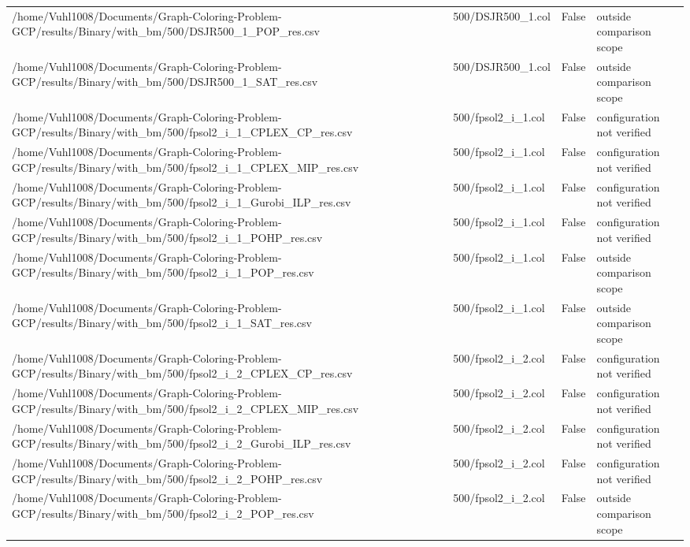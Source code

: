 \begin{table}[htbp]
\begin{tabular}{llll}
/home/Vuhl1008/Documents/Graph-Coloring-Problem-GCP/results/Binary/with\_bm/500/DSJR500\_1\_POP\_res.csv & 500/DSJR500\_1.col & False & outside comparison scope \\
/home/Vuhl1008/Documents/Graph-Coloring-Problem-GCP/results/Binary/with\_bm/500/DSJR500\_1\_SAT\_res.csv & 500/DSJR500\_1.col & False & outside comparison scope \\
/home/Vuhl1008/Documents/Graph-Coloring-Problem-GCP/results/Binary/with\_bm/500/fpsol2\_i\_1\_CPLEX\_CP\_res.csv & 500/fpsol2\_i\_1.col & False & configuration not verified \\
/home/Vuhl1008/Documents/Graph-Coloring-Problem-GCP/results/Binary/with\_bm/500/fpsol2\_i\_1\_CPLEX\_MIP\_res.csv & 500/fpsol2\_i\_1.col & False & configuration not verified \\
/home/Vuhl1008/Documents/Graph-Coloring-Problem-GCP/results/Binary/with\_bm/500/fpsol2\_i\_1\_Gurobi\_ILP\_res.csv & 500/fpsol2\_i\_1.col & False & configuration not verified \\
/home/Vuhl1008/Documents/Graph-Coloring-Problem-GCP/results/Binary/with\_bm/500/fpsol2\_i\_1\_POHP\_res.csv & 500/fpsol2\_i\_1.col & False & configuration not verified \\
/home/Vuhl1008/Documents/Graph-Coloring-Problem-GCP/results/Binary/with\_bm/500/fpsol2\_i\_1\_POP\_res.csv & 500/fpsol2\_i\_1.col & False & outside comparison scope \\
/home/Vuhl1008/Documents/Graph-Coloring-Problem-GCP/results/Binary/with\_bm/500/fpsol2\_i\_1\_SAT\_res.csv & 500/fpsol2\_i\_1.col & False & outside comparison scope \\
/home/Vuhl1008/Documents/Graph-Coloring-Problem-GCP/results/Binary/with\_bm/500/fpsol2\_i\_2\_CPLEX\_CP\_res.csv & 500/fpsol2\_i\_2.col & False & configuration not verified \\
/home/Vuhl1008/Documents/Graph-Coloring-Problem-GCP/results/Binary/with\_bm/500/fpsol2\_i\_2\_CPLEX\_MIP\_res.csv & 500/fpsol2\_i\_2.col & False & configuration not verified \\
/home/Vuhl1008/Documents/Graph-Coloring-Problem-GCP/results/Binary/with\_bm/500/fpsol2\_i\_2\_Gurobi\_ILP\_res.csv & 500/fpsol2\_i\_2.col & False & configuration not verified \\
/home/Vuhl1008/Documents/Graph-Coloring-Problem-GCP/results/Binary/with\_bm/500/fpsol2\_i\_2\_POHP\_res.csv & 500/fpsol2\_i\_2.col & False & configuration not verified \\
/home/Vuhl1008/Documents/Graph-Coloring-Problem-GCP/results/Binary/with\_bm/500/fpsol2\_i\_2\_POP\_res.csv & 500/fpsol2\_i\_2.col & False & outside comparison scope \\

\end{tabular}
\end{table}
